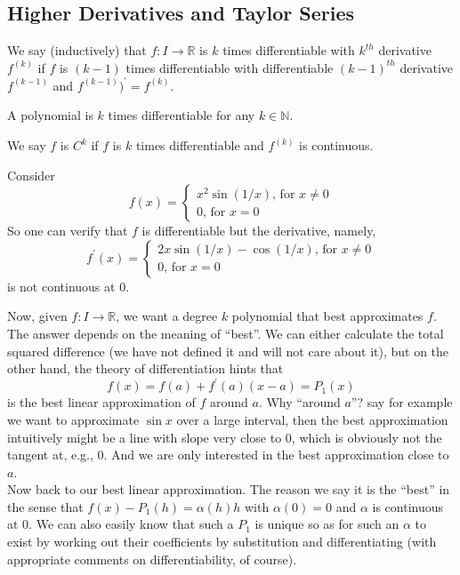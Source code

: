 \subsection{Higher Derivatives and Taylor Series}
\begin{definition}
    We say (inductively) that $f:I\to\mathbb R$ is $k$ times differentiable with $k^{th}$ derivative $f^{(k)}$ if $f$ is $(k-1)$ times differentiable with differentiable $(k-1)^{th}$ derivative $f^{(k-1)}$ and $f^{(k-1)})^\prime=f^{(k)}$.
\end{definition}
\begin{example}
    A polynomial is $k$ times differentiable for any $k\in\mathbb N$.
\end{example}
\begin{definition}
    We say $f$ is $C^k$ if $f$ is $k$ times differentiable and $f^{(k)}$ is continuous.
\end{definition}
\begin{example}
    Consider
    $$f(x)=\begin{cases}
        x^2\sin(1/x)\text{, for $x\neq 0$}\\
        0\text{, for $x=0$}
    \end{cases}$$
    So one can verify that $f$ is differentiable but the derivative, namely,
    $$f^\prime(x)=\begin{cases}
        2x\sin(1/x)-\cos(1/x)\text{, for $x\neq 0$}\\
        0\text{, for $x=0$}
    \end{cases}$$
    is not continuous at $0$.
\end{example}
Now, given $f:I\to\mathbb R$, we want a degree $k$ polynomial that best approximates $f$.
The answer depends on the meaning of ``best''.
We can either calculate the total squared difference (we have not defined it and will not care about it), but on the other hand, the theory of differentiation hints that
$$f(x)=f(a)+f^\prime(a)(x-a)=P_1(x)$$
is the best linear approximation of $f$ around $a$.
Why ``around $a$''?
say for example we want to approximate $\sin x$ over a large interval, then the best approximation intuitively might be a line with slope very close to $0$, which is obviously not the tangent at, e.g., $0$.
And we are only interested in the best approximation close to $a$.\\
Now back to our best linear approximation.
The reason we say it is the ``best'' in the sense that $f(x)-P_1(h)=\alpha(h)h$ with $\alpha(0)=0$ and $\alpha$ is continuous at $0$.
We can also easily know that such a $P_1$ is unique so as for such an $\alpha$ to exist by working out their coefficients by substitution and differentiating (with appropriate comments on differentiability, of course).
